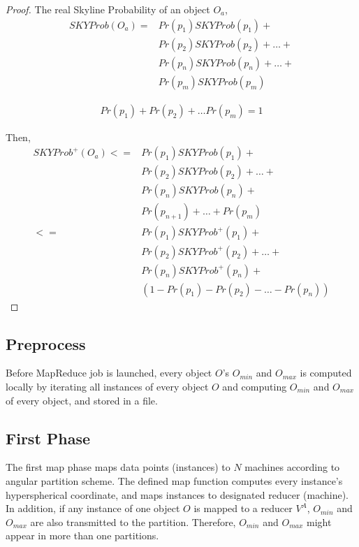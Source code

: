 \begin{proof}
The real Skyline Probability of an object $O_a$, 
\begin{equation}
    \begin{aligned}
SKYProb(O_a) = & Pr(p_1)SKYProb(p_1) + \\ 
& Pr(p_2)SKYProb(p_2) + \dots + \\
& Pr(p_n)SKYProb(p_n)+ \dots +  \\
& Pr(p_m)SKYProb(p_m)
    \end{aligned}
\end{equation}

\begin{equation}
    \begin{aligned}
Pr(p_1)+ Pr(p_2) + \dots Pr(p_m) = 1
    \end{aligned}
\end{equation}

Then, 
\begin{equation}
    \begin{aligned}
SKYProb^{+}(O_a) <= & Pr(p_1)SKYProb(p_1) + \\ 
& Pr(p_2)SKYProb(p_2) + \dots + \\
& Pr(p_n)SKYProb(p_n)+ \\
& Pr(p_{n+1}) + \dots + Pr(p_{m})\\
<= & Pr(p_1)SKYProb^{+}(p_1) + \\ 
& Pr(p_2)SKYProb^{+}(p_2) + \dots + \\
& Pr(p_n)SKYProb^{+}(p_n)+ \\
& (1-Pr(p_1) - Pr(p_2) - \dots -Pr(p_n)) 
    \end{aligned}
\end{equation}
\end{proof}


\subsection{Preprocess}

Before MapReduce job is launched, every object $O$'s $O_{min}$ and $O_{max}$ is computed locally by iterating all instances of every object $O$ and computing $O_{min}$ and $O_{max}$ of every object, and stored in a file.

\subsection{First Phase}
The first map phase maps data points (instances) to $N$ machines according to angular partition scheme. The defined map function computes every instance's hyperspherical coordinate, and maps instances to designated reducer (machine). In addition, if any instance of one object $O$ is mapped to a reducer $V^A$, $O_{min}$ and $O_{max}$ are also transmitted to the partition. Therefore, $O_{min}$ and $O_{max}$ might appear in more than one partitions.

